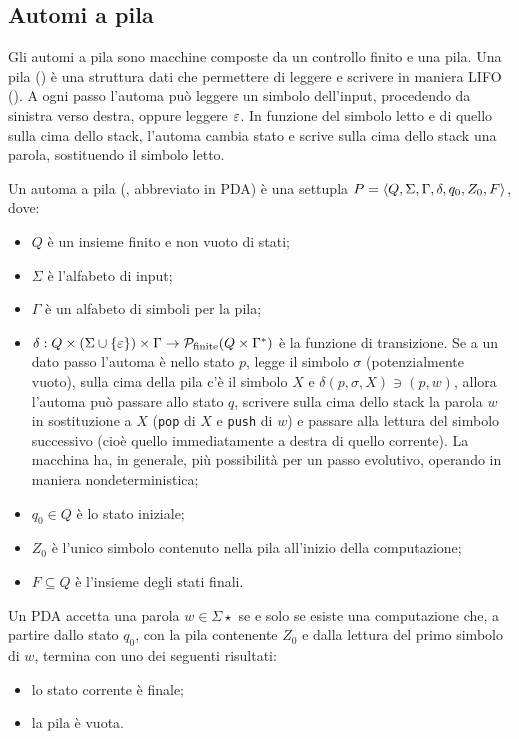 \subsection{Automi a pila}
Gli automi a pila sono macchine composte da un controllo finito e una pila. Una pila () è una struttura dati che permettere di leggere e scrivere in maniera LIFO (). A ogni passo l'automa può leggere un simbolo dell'input, procedendo da sinistra verso destra, oppure leggere $\varepsilon$. In funzione del simbolo letto e di quello sulla cima dello stack, l'automa cambia stato e scrive sulla cima dello stack una parola, sostituendo il simbolo letto.
\begin{defin}
	Un automa a pila (, abbreviato in PDA) è una settupla $P=\langle Q,\Sigma,\Gamma,\delta,q_0,Z_0,F \rangle$, dove:
	\begin{itemize}
		\item $Q$ è un insieme finito e non vuoto di stati;
		\item $\Sigma$ è l'alfabeto di input;
		\item $\Gamma$ è un alfabeto di simboli per la pila;
		\item $\delta:Q\times(\Sigma\cup\left\{ \varepsilon \right\})\times\Gamma\to \mathcal P_{\text{finite}}(Q\times\Gamma^*)$ è la funzione di transizione. Se a un dato passo l'automa è nello stato $p$, legge il simbolo $\sigma$ (potenzialmente vuoto), sulla cima della pila c'è il simbolo $X$ e $\delta(p,\sigma,X)\ni (p,w)$, allora l'automa può passare allo stato $q$, scrivere sulla cima dello stack la parola $w$ in sostituzione a $X$ (\verb!pop! di $X$ e \verb!push! di $w$) e passare alla lettura del simbolo successivo (cioè quello immediatamente a destra di quello corrente). La macchina ha, in generale, più possibilità per un passo evolutivo, operando in maniera nondeterministica;
		\item $q_0\in Q$ è lo stato iniziale;
		\item $Z_0$ è l'unico simbolo contenuto nella pila all'inizio della computazione;
		\item $F\subseteq Q$ è l'insieme degli stati finali.
	\end{itemize}
	Un PDA accetta una parola $w\in\Sigma\star$ se e solo se esiste una computazione che, a partire dallo stato $q_0$, con la pila contenente $Z_0$ e dalla lettura del primo simbolo di $w$, termina con uno dei seguenti risultati:
	\begin{itemize}
		\item lo stato corrente è finale;
		\item la pila è vuota.
	\end{itemize}
\end{defin}


